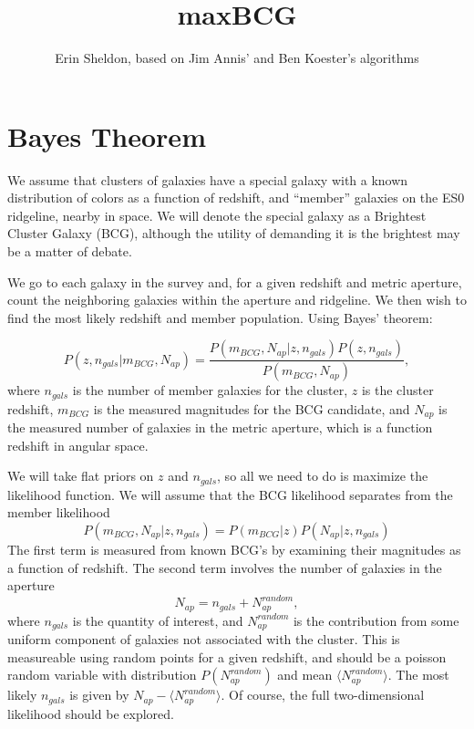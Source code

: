 \documentclass[preprint]{aastex}
\begin{document}
\title{maxBCG}
\author{Erin Sheldon, based on Jim Annis' and Ben Koester's algorithms}

\section{Bayes Theorem}

We assume that clusters of galaxies have a special galaxy with a known
distribution of colors as a function of redshift, and ``member'' galaxies on
the ES0 ridgeline, nearby in space.  We will denote the special galaxy as a
Brightest Cluster Galaxy (BCG), although the utility of demanding it is the
brightest may be a matter of debate. 

We go to each galaxy in the survey and, for a given redshift and metric
aperture, count the neighboring galaxies within the aperture and ridgeline. We
then wish to find the most likely redshift and member population.  Using Bayes'
theorem:

\begin{equation} \label{eq:posterior}
P(z, n_{gals} | m_{BCG}, N_{ap}) = \frac{ P(m_{BCG}, N_{ap} | z, n_{gals}) P(z, n_{gals}) }{P(m_{BCG}, N_{ap})},
\end{equation}
where $n_{gals}$ is the number of member galaxies for the cluster, $z$ is the
cluster redshift, $m_{BCG}$ is the measured magnitudes for the BCG candidate,
and $N_{ap}$ is the measured number of galaxies in the metric aperture, which
is a function redshift in angular space.

We will take flat priors on $z$ and $n_{gals}$, so all we need to do is
maximize the likelihood function.  We will assume that the BCG likelihood
separates from the member likelihood
\begin{equation} \label{eq:likelihood}
P(m_{BCG}, N_{ap} | z, n_{gals}) = P(m_{BCG}|z)P(N_{ap} | z, n_{gals})
\end{equation}
The first term is measured from known BCG's by examining their magnitudes
as a function of redshift.  The second term involves the number of galaxies
in the aperture
\begin{equation} \label{eq:nap_like}
N_{ap} = n_{gals} + N_{ap}^{random},
\end{equation}
where $n_{gals}$ is the quantity of interest, and $N_{ap}^{random}$ is the
contribution from some uniform component of galaxies not associated with the
cluster.  This is measureable using random points for a given redshift, and
should be a poisson random variable with distribution $P(N_{ap}^{random})$ and
mean $\langle N_{ap}^{random} \rangle$.  The most likely $n_{gals}$ is given by
$N_{ap} - \langle N_{ap}^{random} \rangle$.  Of course, the full
two-dimensional likelihood should be explored.
\end{document}
